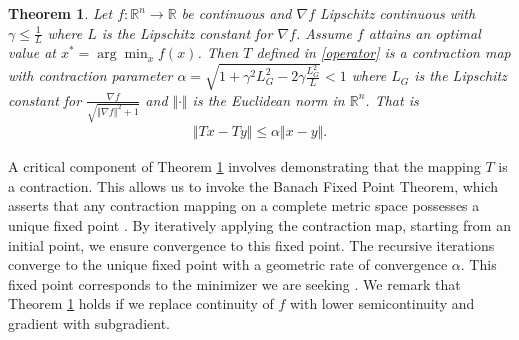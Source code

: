 \documentclass{article}
\newtheorem{theorem}{Theorem}
\begin{document}
\begin{theorem}\label{geo-deterministic}
Let $f:\mathbb{R}^n \to \mathbb{R}$ be continuous and $\nabla f$ Lipschitz continuous with $\gamma \le \frac{1}{L} $ where $L$ is the Lipschitz constant for $\nabla f$. Assume $f$ attains an optimal value at $x^* = \arg\min_x f(x)$. Then $T$ defined in \eqref{operator} is a contraction map with contraction parameter $\alpha = \sqrt{1 + \gamma^2 L_G^2 - 2\gamma \frac{L_G^2}{L}} < 1$ where $L_G$ is the Lipschitz constant for 
$\displaystyle \frac{\nabla f}{\sqrt{\Vert \nabla f \Vert^2 + 1}} $ and $\Vert \cdot \Vert$ is the Euclidean norm in $\mathbb{R}^n$. That is
\begin{align}
\Vert Tx - Ty \Vert \le \alpha \Vert x - y \Vert.
\end{align}
\end{theorem}

\noindent
A critical component of Theorem \ref{geo-deterministic} involves demonstrating that the mapping $T$ is a contraction. This allows us to invoke the Banach Fixed Point Theorem, which asserts  that any contraction mapping on a complete metric space possesses a unique fixed point \citep{chidume2009geo, rudin1976principles, sutherland2009introduction, granas2003fixed}. By iteratively applying the contraction map, starting from an initial point, we ensure convergence to this fixed point. The recursive iterations converge to the unique fixed point with a geometric rate of convergence $\alpha$. This fixed point corresponds to the minimizer we are seeking \citep{boyd2016primer}. 
We remark that Theorem \ref{geo-deterministic} holds if we replace continuity of $f$ with lower semicontinuity and gradient with subgradient.
\end{document}
